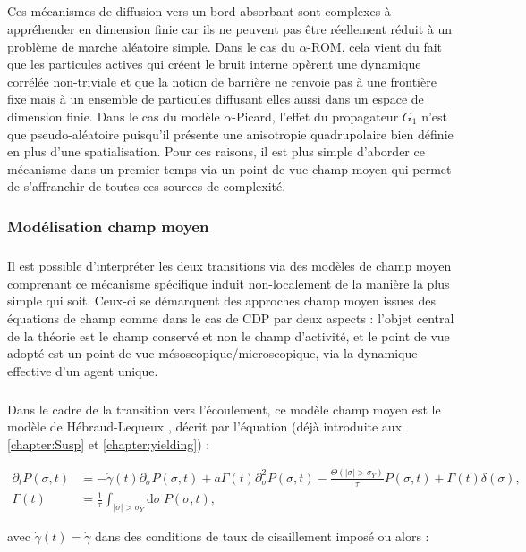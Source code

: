 \subparagraph{}Ces mécanismes de diffusion vers un bord absorbant sont complexes à appréhender en dimension finie car ils ne peuvent pas être réellement réduit à un problème de marche aléatoire simple. Dans le cas du $\alpha$-ROM, cela vient du fait que les particules actives qui créent le bruit interne opèrent une dynamique corrélée non-triviale et que la notion de barrière ne renvoie pas à une frontière fixe mais à un ensemble de particules diffusant elles aussi dans un espace de dimension finie. Dans le cas du modèle $\alpha$-Picard, l'effet du propagateur $G_1$ n'est que pseudo-aléatoire puisqu'il présente une anisotropie quadrupolaire bien définie en plus d'une spatialisation. Pour ces raisons, il est plus simple d'aborder ce mécanisme dans un premier temps via un point de vue champ moyen qui permet de s'affranchir de toutes ces sources de complexité. 

\subsubsection{Modélisation champ moyen}

\subparagraph{}Il est possible d’interpréter les deux transitions via des modèles de champ moyen comprenant ce mécanisme spécifique induit non-localement de la manière la plus simple qui soit. Ceux-ci se démarquent des approches champ moyen issues des équations de champ comme dans le cas de CDP par deux aspects : l'objet central de la théorie est le champ conservé et non le champ d'activité, et le point de vue adopté est un point de vue mésoscopique/microscopique, via la dynamique effective d'un agent unique.

\subparagraph{}Dans le cadre de la transition vers l'écoulement, ce modèle champ moyen est le modèle de Hébraud-Lequeux \cite{hebraud_mode_coupling_1998}, décrit par l'équation (déjà introduite aux \autoref{chapter:Susp} et \autoref{chapter:yielding}) :

\begin{equation}
\begin{aligned}
	\partial_t P(\sigma, t) &= -\dot{\gamma}(t)\partial_\sigma P(\sigma, t) + a\Gamma(t)\partial_\sigma^2P(\sigma, t) - \frac{\Theta (|\sigma|>\sigma_Y)}{\tau}P(\sigma, t) + \Gamma(t)\delta(\sigma),\\
	\Gamma(t) &= \frac{1}{\tau}\int_{|\sigma|>\sigma_Y}\mathrm{d}\sigma ~ P(\sigma, t),
\end{aligned}
\end{equation}

\noindent avec $\dot{\gamma}(t) = \dot{\gamma}$ dans des conditions de taux de cisaillement imposé ou alors :


